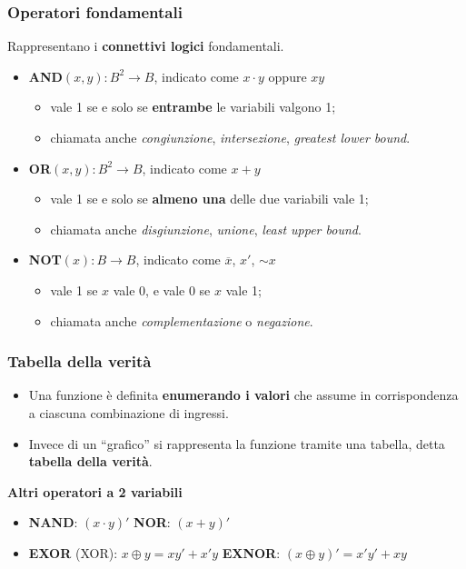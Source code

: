 \documentclass[12pt, a4paper]{article}
\begin{document}
\subsubsection{Operatori fondamentali}
Rappresentano i \textbf{connettivi logici} fondamentali.
\begin{itemize}
    \item \textbf{AND}$(x, y) : B^2 \to B$, indicato come $x \cdot y$ oppure $xy$
    \begin{itemize}
        \item vale 1 se e solo se \textbf{entrambe} le variabili valgono 1;
        \item chiamata anche \emph{congiunzione}, \emph{intersezione}, \emph{greatest lower bound}.
    \end{itemize}
    \item \textbf{OR}$(x, y) : B^2 \to B$, indicato come $x + y$
    \begin{itemize}
        \item vale 1 se e solo se \textbf{almeno una} delle due variabili vale 1;
        \item chiamata anche \emph{disgiunzione}, \emph{unione}, \emph{least upper bound}.
    \end{itemize}
    \item \textbf{NOT}$(x) : B \to B$, indicato come $\overline{x}$, $x'$, $\sim x$
    \begin{itemize}
        \item vale 1 se $x$ vale 0, e vale 0 se $x$ vale 1;
        \item chiamata anche \emph{complementazione} o \emph{negazione}.
    \end{itemize}
\end{itemize}

\subsubsection{Tabella della verità}
\begin{itemize}
    \item Una funzione è definita \textbf{enumerando i valori} che assume in corrispondenza a ciascuna combinazione di ingressi.
    \item Invece di un ``grafico'' si rappresenta la funzione tramite una tabella, detta \textcolor{red!80!black}{\textbf{tabella della verità}}.
\end{itemize}

\textbf{Altri operatori a 2 variabili}
\begin{itemize}
    \item \textbf{NAND}: $(x \cdot y)'$ \qquad \textbf{NOR}: $(x + y)'$
    \item \textbf{EXOR} (XOR): $x \oplus y = xy' + x'y$ \qquad \textbf{EXNOR}: $(x \oplus y)' = x'y' + xy$
\end{itemize}
\end{document}
